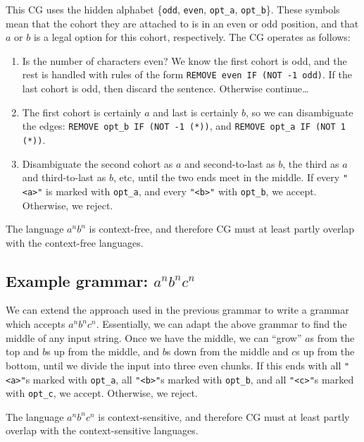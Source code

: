 \documentclass[11pt]{article}
\def\t#1{\texttt{#1}}
\begin{document}
This CG uses the hidden alphabet \{\t{odd}, \t{even}, 
\t{opt\_a}, \t{opt\_b}\}.
These symbols mean that the cohort they are attached to is in an even or odd
position, 
and that $a$ or $b$ is a legal option for this cohort, respectively. 
The CG operates as follows:
\begin{enumerate}
\item
  Is the number of characters even? We know the first cohort is odd, and the
  rest is handled with rules of the form \t{REMOVE even IF (NOT -1 odd)}. If the
  last cohort is odd, then discard the sentence. Otherwise continue\dots
\item
  The first cohort is certainly $a$ and last is certainly $b$, so we can
  disambiguate the edges: 
  \t{REMOVE opt\_b IF (NOT -1 (*))}, and \t{REMOVE opt\_a IF (NOT 1 (*))}. 
\item
  Disambiguate the second cohort as $a$ and second-to-last as $b$, the third as
  $a$ and third-to-last as $b$, etc, until the two ends meet in the middle. If
  every \t{"<a>"} is marked with \t{opt\_a}, and every \t{"<b>"} with
  \t{opt\_b}, we accept. Otherwise, we reject.  
\end{enumerate}
The language $a^nb^n$ is context-free, and therefore CG must at least partly
overlap with the context-free languages.

\subsection{Example grammar: $a^nb^nc^n$}

We can extend the approach used in the previous grammar to write a grammar which
accepts $a^nb^nc^n$. Essentially, we can adapt the above grammar to find the
middle of any input string. Once we have the middle, we can ``grow'' $a$s from
the top and $b$s up from the middle, and $b$s down from the middle and $c$s up
from the bottom, until we divide the input into three even chunks.
If this ends with all \t{"<a>"}s marked with \t{opt\_a}, all \t{"<b>"}s marked
with \t{opt\_b}, and all \t{"<c>"}s marked with \t{opt\_c}, we accept.
Otherwise, we reject.

The language $a^nb^nc^n$ is context-sensitive, and therefore CG must at least
partly overlap with the context-sensitive languages. 
\end{document}
